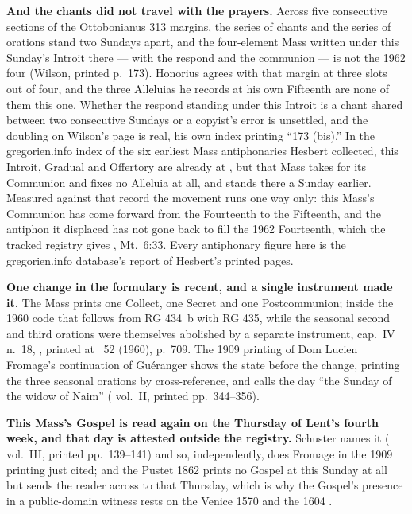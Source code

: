 \textbf{And the chants did not travel with the prayers.} Across five
consecutive sections of the Ottobonianus 313 margins, the series of chants and
the series of orations stand two Sundays apart, and the four-element Mass
written under this Sunday's Introit there --- with the respond  and the communion  --- is not the 1962 four
(Wilson, printed p.~173). Honorius agrees with that margin at three slots out
of four, and the three Alleluias he records at his own Fifteenth are none of
them this one. Whether the respond standing under this Introit is a chant
shared between two consecutive Sundays or a copyist's error is unsettled, and
the doubling on Wilson's page is real, his own index printing ``173 (bis).''
In the gregorien.info index of the six earliest Mass antiphonaries Hesbert
collected, this Introit, Gradual and Offertory are already at , but that Mass takes  for
its Communion and fixes no Alleluia at all, and 
stands there a Sunday earlier. Measured against that record the movement runs
one way only: this Mass's Communion has come forward from the Fourteenth to
the Fifteenth, and the antiphon it displaced has not gone back to fill the 1962
Fourteenth, which the tracked registry gives , Mt.\ 6:33.
Every antiphonary figure here is the gregorien.info database's report of
Hesbert's printed pages.

\textbf{One change in the formulary is recent, and a single instrument made
it.} The Mass prints one Collect, one Secret and one Postcommunion; inside the
1960 code that follows from RG 434~b with RG 435, while the seasonal second
and third orations were themselves abolished by a separate instrument,
 cap.~IV n.~18,
, printed at ~52 (1960), p.~709. The 1909 printing of Dom Lucien Fromage's
continuation of Guéranger shows the state
before the change, printing the three seasonal orations by cross-reference,
and calls the day ``the Sunday of the widow of Naim'' ( vol.~II, printed pp.~344--356).

\textbf{This Mass's Gospel is read again on the Thursday of Lent's fourth
week, and that day is attested outside the registry.} Schuster names it
( vol.~III, printed pp.~139--141) and so, independently,
does Fromage in the 1909 printing just cited; and the Pustet 1862 prints no Gospel
at this Sunday at all but sends the reader across to that Thursday, which is
why the Gospel's presence in a public-domain witness rests on the Venice 1570
and the 1604 .
